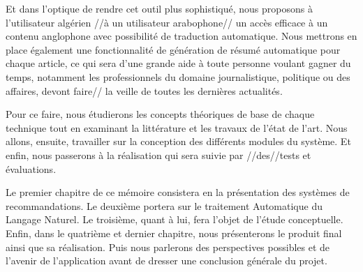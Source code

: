 Et dans l'optique de rendre cet outil plus sophistiqué, nous proposons à l'utilisateur algérien //à un utilisateur arabophone// un accès efficace à un contenu anglophone avec possibilité de traduction automatique. Nous mettrons en place également une fonctionnalité de génération de résumé automatique pour chaque article, ce qui sera d'une grande aide à toute personne voulant gagner du temps, notamment les professionnels du domaine journalistique, politique ou des affaires, devont faire// la veille de toutes les dernières actualités.

Pour ce faire, nous étudierons les concepts théoriques de base de chaque technique tout en examinant la littérature et les travaux de l'état de l'art. Nous allons, ensuite, travailler sur la conception des différents modules du système. Et enfin, nous passerons à la réalisation qui sera suivie par //des//tests et évaluations.

Le premier chapitre de ce mémoire consistera en la présentation des systèmes de recommandations. Le deuxième portera sur le  traitement Automatique du Langage Naturel. Le troisième, quant à lui, fera l'objet de l'étude conceptuelle. Enfin, dans le quatrième et dernier chapitre, nous présenterons le produit final ainsi que sa réalisation. Puis nous parlerons des perspectives possibles et de l'avenir de l'application avant de dresser une conclusion générale du projet.

